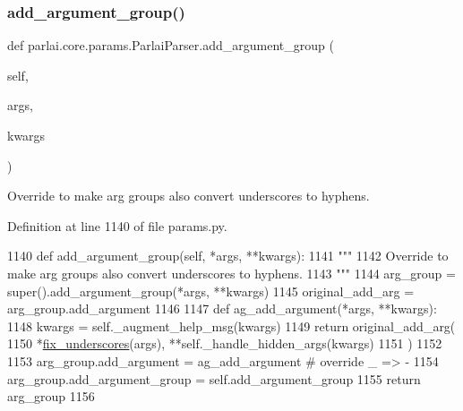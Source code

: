 \subsubsection{\texorpdfstring{add\+\_\+argument\+\_\+group()}{add\_argument\_group()}}
{\footnotesize\ttfamily def parlai.\+core.\+params.\+Parlai\+Parser.\+add\+\_\+argument\+\_\+group (\begin{DoxyParamCaption}\item[{}]{self,  }\item[{}]{args,  }\item[{}]{kwargs }\end{DoxyParamCaption})}

\begin{DoxyVerb}Override to make arg groups also convert underscores to hyphens.
\end{DoxyVerb}
 

Definition at line 1140 of file params.\+py.


\begin{DoxyCode}
1140     \textcolor{keyword}{def }add\_argument\_group(self, *args, **kwargs):
1141         \textcolor{stringliteral}{"""}
1142 \textcolor{stringliteral}{        Override to make arg groups also convert underscores to hyphens.}
1143 \textcolor{stringliteral}{        """}
1144         arg\_group = super().add\_argument\_group(*args, **kwargs)
1145         original\_add\_arg = arg\_group.add\_argument
1146 
1147         \textcolor{keyword}{def }ag\_add\_argument(*args, **kwargs):
1148             kwargs = self.\_augment\_help\_msg(kwargs)
1149             \textcolor{keywordflow}{return} original\_add\_arg(
1150                 *\hyperlink{namespaceparlai_1_1core_1_1params_afe2837a1dc21017be30cc7e3cb3696b8}{fix\_underscores}(args), **self.\_handle\_hidden\_args(kwargs)
1151             )
1152 
1153         arg\_group.add\_argument = ag\_add\_argument  \textcolor{comment}{# override \_ => -}
1154         arg\_group.add\_argument\_group = self.add\_argument\_group
1155         \textcolor{keywordflow}{return} arg\_group
1156 
\end{DoxyCode}
\mbox{\label{classparlai_1_1core_1_1params_1_1ParlaiParser_a63d7f06b4e1222783cb5864cf9a7e782}} 
